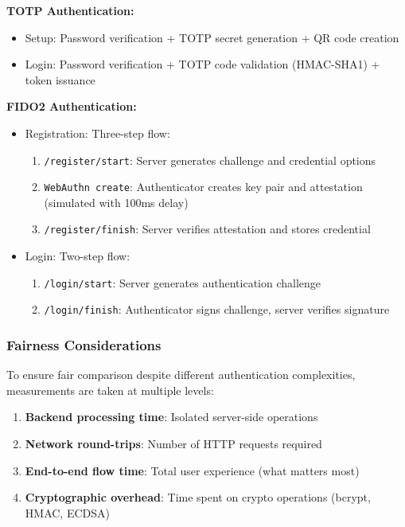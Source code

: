 \textbf{TOTP Authentication:}
\begin{itemize}
    \item Setup: Password verification + TOTP secret generation + QR code creation
    \item Login: Password verification + TOTP code validation (HMAC-SHA1) + token issuance
\end{itemize}

\textbf{FIDO2 Authentication:}
\begin{itemize}
    \item Registration: Three-step flow:
    \begin{enumerate}
        \item \texttt{/register/start}: Server generates challenge and credential options
        \item \texttt{WebAuthn create}: Authenticator creates key pair and attestation (simulated with 100ms delay)
        \item \texttt{/register/finish}: Server verifies attestation and stores credential
    \end{enumerate}
    \item Login: Two-step flow:
    \begin{enumerate}
        \item \texttt{/login/start}: Server generates authentication challenge
        \item \texttt{/login/finish}: Authenticator signs challenge, server verifies signature
    \end{enumerate}
\end{itemize}

\subsubsection{Fairness Considerations}
To ensure fair comparison despite different authentication complexities, measurements are taken at multiple levels:

\begin{enumerate}
    \item \textbf{Backend processing time}: Isolated server-side operations
    \item \textbf{Network round-trips}: Number of HTTP requests required
    \item \textbf{End-to-end flow time}: Total user experience (what matters most)
    \item \textbf{Cryptographic overhead}: Time spent on crypto operations (bcrypt, HMAC, ECDSA)
\end{enumerate}

